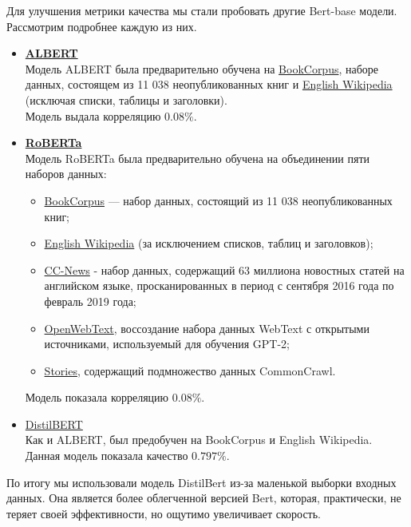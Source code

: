 \documentclass[12pt]{article}
\begin{document}
Для улучшения метрики качества мы стали пробовать другие Bert-base модели. Рассмотрим подробнее каждую из них.
\begin{itemize}
    \item \href{https://huggingface.co/albert-base-v2}{\textbf{ALBERT}} \\
    Модель ALBERT была предварительно обучена на \href{https://yknzhu.wixsite.com/mbweb}{BookCorpus}, наборе данных, состоящем из 11 038 неопубликованных книг и \href{https://en.wikipedia.org/wiki/English_Wikipedia}{English Wikipedia} (исключая списки, таблицы и заголовки). \\
    Модель выдала корреляцию $0.08\%$.

    \item \href{https://huggingface.co/roberta-base}{\textbf{RoBERTa}} \\
    Модель RoBERTa была предварительно обучена на объединении пяти наборов данных:
    \begin{itemize}
        \item \href{https://yknzhu.wixsite.com/mbweb}{BookCorpus} — набор данных, состоящий из 11 038 неопубликованных книг;
        \item \href{https://en.wikipedia.org/wiki/English_Wikipedia}{English Wikipedia} (за исключением списков, таблиц и заголовков);
        \item \href{https://commoncrawl.org/2016/10/news-dataset-available/}{CC-News} - набор данных, содержащий 63 миллиона новостных статей на английском языке, просканированных в период с сентября 2016 года по февраль 2019 года;
        \item \href{https://github.com/jcpeterson/openwebtext}{OpenWebText}, воссоздание набора данных WebText с открытыми источниками, используемый для обучения GPT-2;
        \item \href{https://arxiv.org/abs/1806.02847}{Stories}, содержащий подмножество данных CommonCrawl.
    \end{itemize}
    Модель показала корреляцию $0.08\%$.

    \item \href{https://huggingface.co/distilbert-base-uncased}{DistilBERT} \\
    Как и ALBERT, был предобучен на BookCorpus и English Wikipedia. \\
    Данная модель показала качество $0.797\%$.
\end{itemize}

По итогу мы использовали модель DistilBert из-за маленькой выборки входных данных. Она является более облегченной версией Bert, которая, практически, не теряет своей эффективности, но ощутимо увеличивает скорость. 
\end{document}
